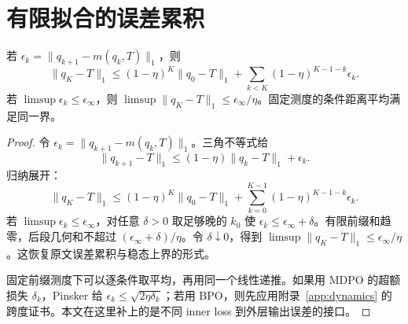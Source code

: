 \section{有限拟合的误差累积}
\begin{theorem}[算术外层的拟合误差累积]
若 $\epsilon_k=\|q_{k+1}-m(q_k,T)\|_1$，则
\begin{equation}
\|q_K-T\|_1\le(1-\eta)^K\|q_0-T\|_1+\sum_{k<K}(1-\eta)^{K-1-k}\epsilon_k.
\end{equation}
若 $\limsup\epsilon_k\le\epsilon_\infty$，则 $\limsup\|q_K-T\|_1\le\epsilon_\infty/\eta$。固定测度的条件距离平均满足同一界。
\end{theorem}
\begin{proof}
令 $\epsilon_k=\|q_{k+1}-m(q_k,T)\|_1$。三角不等式给
\begin{equation}
\|q_{k+1}-T\|_1\le(1-\eta)\|q_k-T\|_1+\epsilon_k.
\end{equation}
归纳展开：
\begin{equation}
\|q_K-T\|_1\le(1-\eta)^K\|q_0-T\|_1
+\sum_{k=0}^{K-1}(1-\eta)^{K-1-k}\epsilon_k.
\label{eq:topd-errors}
\end{equation}
若 $\limsup\epsilon_k\le\epsilon_\infty$，对任意 $\delta>0$ 取足够晚的 $k_0$ 使 $\epsilon_k\le\epsilon_\infty+\delta$。有限前缀和趋零，后段几何和不超过 $(\epsilon_\infty+\delta)/\eta$。令 $\delta\downarrow0$，得到 $\limsup\|q_K-T\|_1\le\epsilon_\infty/\eta$。这恢复原文误差累积与稳态上界的形式。

固定前缀测度下可以逐条件取平均，再用同一个线性递推。如果用 MDPO 的超额损失 $\delta_k$，Pinsker 给 $\epsilon_k\le\sqrt{2\eta\delta_k}$；若用 BPO，则先应用附录~\ref{app:dynamics} 的跨度证书。本文在这里补上的是不同 inner loss 到外层输出误差的接口。
\end{proof}

